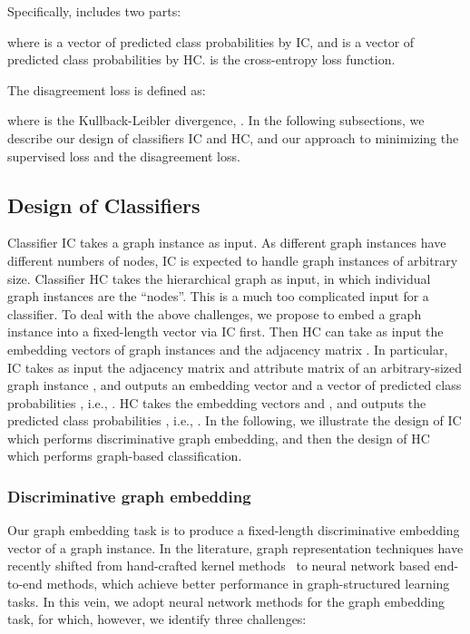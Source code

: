 \documentclass[sigconf]{acmart}
\begin{document}
Specifically,  includes two parts:

where  is a vector of predicted class probabilities by IC, and  is a vector of predicted class probabilities by HC.   is the cross-entropy loss function.

The disagreement loss  is defined as:

where  is the Kullback-Leibler divergence, .  In the following subsections, we describe our design of classifiers IC and HC, and our approach to minimizing the supervised loss and the disagreement loss.



\subsection{Design of Classifiers}\label{demCOCC}
Classifier IC takes a graph instance as input.  As different graph instances have different numbers of nodes, IC is expected to handle graph instances of arbitrary size. Classifier HC takes the hierarchical graph as input, in which individual graph instances are the ``nodes''.  This is a much too complicated input for a classifier.  To deal with the above challenges, we propose to embed a graph instance  into a fixed-length vector  via IC first.  Then HC can take as input the embedding vectors of graph instances and the adjacency matrix . In particular, IC takes as input the adjacency matrix  and attribute matrix  of an arbitrary-sized graph instance , and outputs an embedding vector  and a vector of predicted class probabilities , i.e., .  HC takes the embedding vectors  and , and outputs the predicted class probabilities , i.e., .  In the following, we illustrate the design of IC which performs discriminative graph embedding, and then the design of HC which performs graph-based classification.


\subsubsection{Discriminative graph embedding}\label{dem}

Our graph embedding task is to produce a fixed-length discriminative embedding vector of a graph instance.  In the literature, graph representation techniques have recently shifted from hand-crafted kernel methods~\cite{Yanardag:2015:DGK:2783258.2783417} to neural network based end-to-end methods, which achieve better performance in graph-structured learning tasks.  In this vein, we adopt neural network methods for the graph embedding task, for which, however, we identify three challenges:
\end{document}
